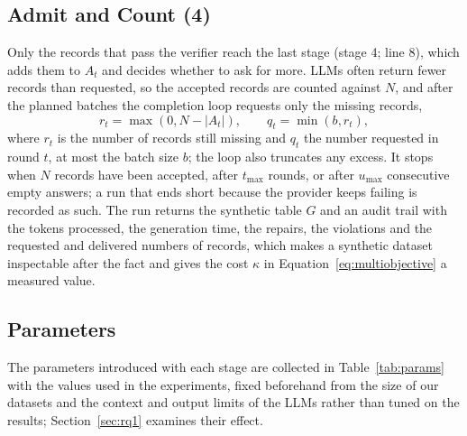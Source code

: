 \documentclass[conference]{IEEEtran}
\begin{document}
\subsection{Admit and Count (4)}
Only the records that pass the verifier reach the last stage (stage 4; line 8), which adds them to $A_t$ and decides whether to ask for more. LLMs often return fewer records than requested, so the accepted records are counted against $N$, and after the planned batches the completion loop requests only the missing records,
\begin{equation}
r_t=\max(0,N-|A_t|),\qquad q_t=\min(b,r_t),
\label{eq:residual}
\end{equation}
where $r_t$ is the number of records still missing and $q_t$ the number requested in round $t$, at most the batch size $b$; the loop also truncates any excess. It stops when $N$ records have been accepted, after $t_{\max}$ rounds, or after $u_{\max}$ consecutive empty answers; a run that ends short because the provider keeps failing is recorded as such. The run returns the synthetic table $G$ and an audit trail with the tokens processed, the generation time, the repairs, the violations and the requested and delivered numbers of records, which makes a synthetic dataset inspectable after the fact and gives the cost $\kappa$ in Equation~\eqref{eq:multiobjective} a measured value.

\subsection{Parameters}
The parameters introduced with each stage are collected in Table~\ref{tab:params} with the values used in the experiments, fixed beforehand from the size of our datasets and the context and output limits of the LLMs rather than tuned on the results; Section~\ref{sec:rq1} examines their effect.
\end{document}
